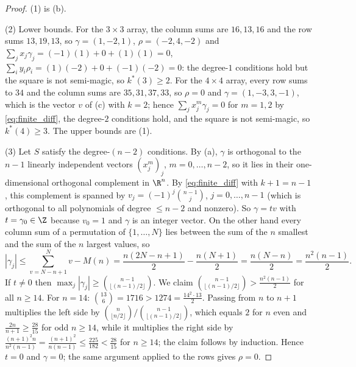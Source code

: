 \begin{proof}
(1) is (b).

(2) Lower bounds.  For the $3\times3$ array, the column sums are $16,13,16$ and the row sums $13,19,13$, so
$\gamma=(1,-2,1)$, $\rho=(-2,4,-2)$ and $\sum_jx_j\gamma_j=(-1)(1)+0+(1)(1)=0$, $\sum_iy_i\rho_i=(1)(-2)+0+(-1)(-2)=0$:
the degree-$1$ conditions hold but the square is not semi-magic, so $k^{*}(3)\ge2$.
For the $4\times4$ array, every row sums to $34$ and the column sums are $35,31,37,33$, so $\rho=0$ and
$\gamma=(1,-3,3,-1)$, which is the vector $v$ of (c) with $k=2$; hence
$\sum_jx_j^{m}\gamma_j=0$ for $m=1,2$ by \eqref{eq:finite_diff}, the degree-$2$ conditions hold, and the square
is not semi-magic, so $k^{*}(4)\ge3$.  The upper bounds are (1).

(3) Let $S$ satisfy the degree-$(n-2)$ conditions.  By (a), $\gamma$ is orthogonal to the
$n-1$ linearly independent vectors $(x_j^{m})_j$, $m=0,\dots,n-2$, so it lies in their one-dimensional orthogonal
complement in $\R^{n}$.  By \eqref{eq:finite_diff} with $k+1=n-1$, this complement is spanned by
$v_j=(-1)^{j}\binom{n-1}{j}$, $j=0,\dots,n-1$ (which is orthogonal to all polynomials of degree $\le n-2$ and
nonzero).  So $\gamma=tv$ with $t=\gamma_0\in\Z$ because $v_0=1$ and $\gamma$ is an integer vector.
On the other hand every column sum of a permutation of $\{1,\dots,N\}$ lies between the sum of the $n$ smallest
and the sum of the $n$ largest values, so
\[
|\gamma_j|\le\sum_{v=N-n+1}^{N}v-M(n)=\frac{n(2N-n+1)}{2}-\frac{n(N+1)}{2}=\frac{n(N-n)}{2}=\frac{n^{2}(n-1)}{2}.
\]
If $t\ne0$ then $\max_j|\gamma_j|\ge\binom{n-1}{\lfloor(n-1)/2\rfloor}$.  We claim
$\binom{n-1}{\lfloor(n-1)/2\rfloor}>\frac{n^{2}(n-1)}2$ for all $n\ge14$.  For $n=14$: $\binom{13}{6}=1716>1274=\frac{14^{2}\cdot13}{2}$.
Passing from $n$ to $n+1$ multiplies the left side by $\binom{n}{\lfloor n/2\rfloor}/\binom{n-1}{\lfloor(n-1)/2\rfloor}$,
which equals $2$ for $n$ even and $\frac{2n}{n+1}\ge\frac{28}{15}$ for odd $n\ge14$, while it multiplies the right side by
$\frac{(n+1)^{2}n}{n^{2}(n-1)}=\frac{(n+1)^{2}}{n(n-1)}\le\frac{225}{182}<\frac{28}{15}$ for $n\ge14$; the claim follows by induction.
Hence $t=0$ and $\gamma=0$; the same argument applied to the rows gives $\rho=0$.
\end{proof}

